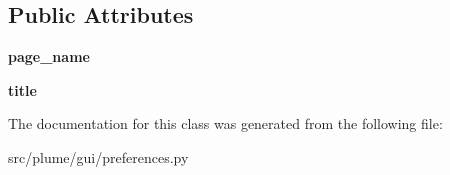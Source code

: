 \subsection*{Public Attributes}
\begin{DoxyCompactItemize}
\item 
{\bfseries page\+\_\+name}\hypertarget{classplume-creator_1_1src_1_1plume_1_1gui_1_1preferences_1_1_preferences_page_template_a271ad07c73f763b47ac9f112ed624fc6}{}\label{classplume-creator_1_1src_1_1plume_1_1gui_1_1preferences_1_1_preferences_page_template_a271ad07c73f763b47ac9f112ed624fc6}

\item 
{\bfseries title}\hypertarget{classplume-creator_1_1src_1_1plume_1_1gui_1_1preferences_1_1_preferences_page_template_aa3a7d2da36b9f294669900df5b5a4664}{}\label{classplume-creator_1_1src_1_1plume_1_1gui_1_1preferences_1_1_preferences_page_template_aa3a7d2da36b9f294669900df5b5a4664}

\end{DoxyCompactItemize}


The documentation for this class was generated from the following file\+:\begin{DoxyCompactItemize}
\item 
src/plume/gui/preferences.\+py\end{DoxyCompactItemize}

